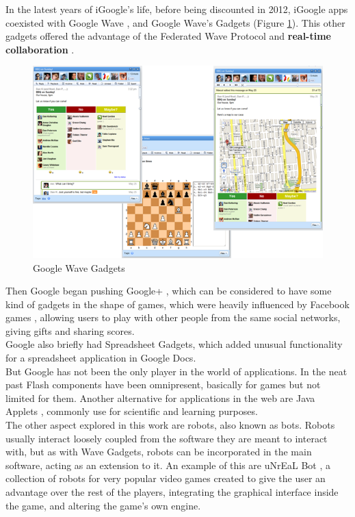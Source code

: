 In the latest years of iGoogle's life, before being discounted in 2012, iGoogle apps coexisted with Google Wave \cite{ref:wave_guide}, and Google Wave's Gadgets (Figure \ref{fig:wave_gadgets}). This other gadgets offered the advantage of the Federated Wave Protocol \cite{ref:wave_federation_protocol} and \textbf{real-time collaboration} \cite{ref:apache_wave_about}.\\[.2cm]
\begin{figure}[h]
  \center
    \includegraphics[keepaspectratio, scale=0.5]{Media/Captures/Soa/WaveGadgets.png}
  \caption{Google Wave Gadgets}
  \label{fig:wave_gadgets}
\end{figure}
Then Google began pushing Google+ \cite{ref:google_plus}, which can be considered to have some kind of gadgets in the shape of games, which were heavily influenced by Facebook games \cite{ref:facebook_games}, allowing users to play with other people from the same social networks, giving gifts and sharing scores.\\[.2cm]
Google also briefly had Spreadsheet Gadgets, which added unusual functionality for a spreadsheet application in Google Docs.\\[.2cm]
But Google has not been the only player in the world of applications. In the neat past Flash \cite{ref:adobe_flash} components have been omnipresent, basically for games but not limited for them. Another alternative for applications in the web are Java Applets \cite{ref:java_applets}, commonly use for scientific and learning purposes.\\[.2cm]
The other aspect explored in this work are robots, also known as bots. Robots usually interact loosely coupled from the software they are meant to interact with, but as with Wave Gadgets, robots can be incorporated in the main software, acting as an extension to it. An example of this are uNrEaL Bot \cite{ref:unreal_bot}, a collection of robots for very popular video games created to give the user an advantage over the rest of the players, integrating the graphical interface inside the game, and altering the game's own engine.\\[.2cm]
